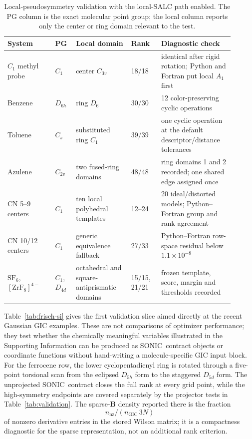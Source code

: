 \documentclass[journal=jctcce,manuscript=article,layout=traditional]{achemso}
\newcommand{\SONIC}{SONIC}
\newcommand{\Bmat}{\mathbf{B}}
\theoremstyle{definition}
\begin{document}
\begin{table}[htbp]
\centering
\scriptsize
\setlength{\tabcolsep}{3pt}
\caption{Local-pseudosymmetry validation with the local-SALC path enabled.
The PG column is the exact molecular point group; the local column reports only
the center or ring domain relevant to the test.}
\label{tab:local-salc-validation}
\begin{tabular}{@{}p{0.19\linewidth}p{0.08\linewidth}p{0.22\linewidth}p{0.12\linewidth}p{0.29\linewidth}@{}}
\toprule
System & PG & Local domain & Rank & Diagnostic check \\
\midrule
\(C_1\) methyl probe & \(C_1\) & center \(C_{3v}\) & 18/18 & identical after rigid rotation; Python and Fortran put local \(A_1\) first \\
\midrule
Benzene & \(D_{6h}\) & ring \(D_6\) & 30/30 & 12 color-preserving cyclic operations \\
\midrule
Toluene & \(C_s\) & substituted ring \(C_1\) & 39/39 & one cyclic operation at the default descriptor/distance tolerances \\
\midrule
Azulene & \(C_{2v}\) & two fused-ring domains & 48/48 & ring domains 1 and 2 recorded; one shared edge assigned once \\
\midrule
CN 5--9 centers & \(C_1\) & ten local polyhedral templates & 12--24 & 20 ideal/distorted models; Python--Fortran group and rank agreement \\
\midrule
CN 10/12 centers & \(C_1\) & generic equivalence fallback & 27/33 & Python--Fortran row-space residual below \(1.1\times10^{-8}\) \\
\midrule
\(\mathrm{SF_6}\), \([\mathrm{ZrF_8}]^{4-}\) & \(C_1\), \(D_{4d}\) & octahedral and square-antiprismatic domains & 15/15, 21/21 & frozen template, score, margin and thresholds recorded \\
\bottomrule
\end{tabular}
\end{table}

Table~\ref{tab:frisch-si} gives the first validation slice aimed directly at
the recent Gaussian GIC examples.  These are not comparisons of optimizer
performance; they test whether the chemically meaningful variables illustrated
in the Supporting Information can be produced as \SONIC\ contract objects or
coordinate functions without hand-writing a molecule-specific GIC input block.
For the ferrocene row, the lower cyclopentadienyl ring is rotated through a
five-point torsional scan from the eclipsed \(D_{5h}\) form to the staggered
\(D_{5d}\) form.  The unprojected \SONIC\ contract closes the full rank at every
grid point, while the high-symmetry endpoints are covered separately by the
projector tests in Table~\ref{tab:validation}.  The sparse-\(\Bmat\) density
reported there is the fraction
\[
  n_{\mathrm{nz}}/(n_{\mathrm{GIC}}\,3N)
\]
of nonzero derivative entries in the stored Wilson matrix; it is a compactness
diagnostic for the sparse representation, not an additional rank criterion.
\end{document}
